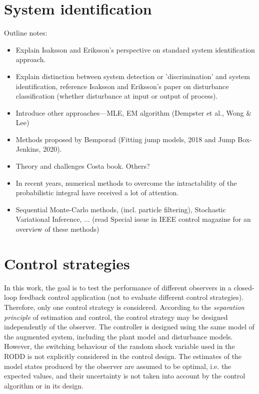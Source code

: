 \section{System identification}

Outline notes:
\begin{itemize}
	\item Explain Isaksson and Eriksson's perspective on standard system identification approach.
	\item Explain distinction between system detection or 'discrimination' and system identification, reference Isaksson and Eriksson's paper on disturbance classification (whether disturbance at input or output of process).
	\item Introduce other approaches—MLE, EM algorithm (Dempster et al., Wong \& Lee)
	\item Methods proposed by Bemporad (Fitting jump models, 2018 and Jump Box-Jenkins, 2020).
	\item Theory and challenges Costa book. Others?
	\item In recent years, numerical methods to overcome the intractability of the probabilistic integral have received a lot of attention.
	\item Sequential Monte-Carlo methods, (incl. particle filtering), Stochastic Variational Inference, ... (read Special issue in IEEE control magazine for an overview of these methods)
\end{itemize}


\section{Control strategies}

In this work, the goal is to test the performance of different observers in a closed-loop feedback control application (not to evaluate different control strategies). Therefore, only one control strategy is considered. According to the \textit{separation principle} of estimation and control, the control strategy may be designed independently of the observer. The controller is designed using the same model of the augmented system, including the plant model and disturbance models. However, the switching behaviour of the random shock variable used in the RODD is not explicitly considered in the control design. The estimates of the model states produced by the observer are assumed to be optimal, i.e. the expected values, and their uncertainty is not taken into account by the control algorithm or in its design.


